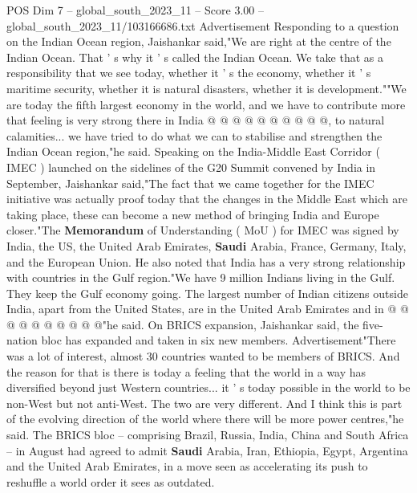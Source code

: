\begin{textsample}{POS Dim 7 – global\_south\_2023\_11 – Score 3.00 – global\_south\_2023\_11/103166686.txt}
Advertisement Responding to a question on the Indian Ocean region, Jaishankar said,"We are right at the centre of the Indian Ocean.
That ' s why it ' s called the Indian Ocean.
We take that as a responsibility that we see today, whether it ' s the economy, whether it ' s maritime security, whether it is natural disasters, whether it is development.""We are today the fifth largest economy in the world, and we have to contribute more that feeling is very strong there in India @ @ @ @ @ @ @ @ @ @, to natural calamities... we have tried to do what we can to stabilise and strengthen the Indian Ocean region,"he said.
Speaking on the India-Middle East Corridor ( IMEC ) launched on the sidelines of the G20 Summit convened by India in September, Jaishankar said,"The fact that we came together for the IMEC initiative was actually proof today that the changes in the Middle East which are taking place, these can become a new method of bringing India and Europe closer."The \textbf{Memorandum} of Understanding ( MoU ) for IMEC was signed by India, the US, the United Arab Emirates, \textbf{Saudi} Arabia, France, Germany, Italy, and the European Union.
He also noted that India has a very strong relationship with countries in the Gulf region."We have 9 million Indians living in the Gulf.
They keep the Gulf economy going.
The largest number of Indian citizens outside India, apart from the United States, are in the United Arab Emirates and in @ @ @ @ @ @ @ @ @ @"he said.
On BRICS expansion, Jaishankar said, the five-nation bloc has expanded and taken in six new members.
Advertisement"There was a lot of interest, almost 30 countries wanted to be members of BRICS.
And the reason for that is there is today a feeling that the world in a way has diversified beyond just Western countries... it ' s today possible in the world to be non-West but not anti-West.
The two are very different.
And I think this is part of the evolving direction of the world where there will be more power centres,"he said.
The BRICS bloc -- comprising Brazil, Russia, India, China and South Africa -- in August had agreed to admit \textbf{Saudi} Arabia, Iran, Ethiopia, Egypt, Argentina and the United Arab Emirates, in a move seen as accelerating its push to reshuffle a world order it sees as outdated.

\end{textsample}
